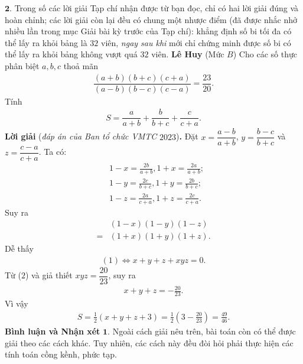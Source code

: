\begin{multicols}{2}
	$\pmb{2.}$ Trong số các lời giải Tạp chí nhận được từ bạn đọc, chỉ có hai lời giải đúng và hoàn chỉnh; các lời giải còn lại đều có chung một nhược điểm (đã được nhắc nhở nhiều lần trong mục Giải bài kỳ trước của Tạp chí): khẳng định số bi tối đa có thể lấy ra khỏi bảng là $32$ viên, \textit{ngay sau khi} mới chỉ chứng minh được số bi có thể lấy ra khỏi bảng không vượt quá $32$ viên.
	\vskip 0.01cm
	\hfill \textbf{\color{thachthuctoanhoc}Lê Huy}
	\vskip 0.01cm
	{}
	(Mức $B$) Cho các số thực phân biệt $a,b,c$  thoả mãn
	\begin{align*}
	\dfrac{(a+b)(b+c)(c+a)}{(a-b)(b-c)(c-a)}=\dfrac{23}{20}.
	\end{align*}
	Tính
	\begin{align*}
	S=\dfrac{a}{a+b}+\dfrac{b}{b+c}+\dfrac{c}{c+a}.
	\end{align*}
	\textbf{\color{thachthuctoanhoc}Lời giải} (\textit{đáp án của Ban tổ chức VMTC} $2023$)\textbf{\color{thachthuctoanhoc}.}
	\vskip 0.05cm
	Đặt $x = \dfrac{{a - b}}{{a + b}}$, $y = \dfrac{{b - c}}{{b + c}}$  và $z = \dfrac{{c - a}}{{c + a}}$.
	\vskip 0.05cm
	Ta có:
	\begin{align*}
		&1 - x = \frac{{2b}}{{a + b}}, 1 + x = \frac{{2a}}{{a + b}};\\[-0.6ex]
		&1 - y = \frac{{2c}}{{b + c}}, 1 + y = \frac{{2b}}{{b + c}};\\[-0.6ex]
		&1 - z = \frac{{2a}}{{c + a}}, 1 + z = \frac{{2c}}{{c + a}}.
	\end{align*}
	Suy ra
	\begin{align*}
		&(1 - x)(1 - y)(1 - z) \\[-0.6ex]
		= &(1 + x)(1 + y)(1 + z). \tag{$1$}
	\end{align*}
	Dễ thấy
	\begin{align*}
		(1) \Leftrightarrow x + y + z + xyz = 0. \tag{$2$}
	\end{align*}
	Từ ($2$) và giả thiết $xyz = \dfrac{20}{23}$, suy ra
	\begin{align*}
		x + y + z =  - \frac{{20}}{{23}}.
	\end{align*}
	Vì vậy
	\begin{align*}
		S = \frac{1}{2}\left( {x + y + z + 3} \right) = \frac{1}{2}\left( {3 - \frac{{20}}{{23}}} \right) = \frac{{49}}{{46}}.
	\end{align*}
	\textbf{\color{thachthuctoanhoc}Bình luận và Nhận xét}
	\vskip 0.05cm
	$\pmb{1.}$ Ngoài cách giải nêu trên, bài toán còn có thể được giải theo các cách khác. Tuy nhiên, các cách này đều đòi hỏi phải thực hiện các tính toán cồng kềnh, phức tạp.

\end{multicols}

